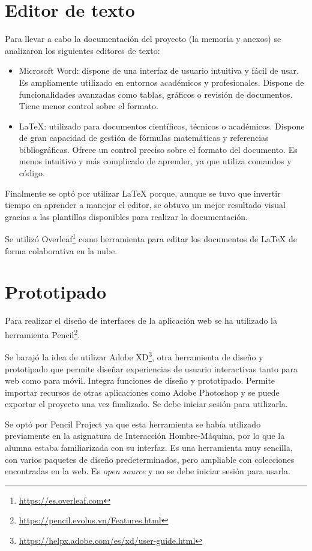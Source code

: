 \section{Editor de texto}
Para llevar a cabo la documentación del proyecto (la memoria y anexos) se analizaron los siguientes editores de texto:
\begin{itemize}
    \item Microsoft Word: dispone de una interfaz de usuario intuitiva y fácil de usar. Es ampliamente utilizado en entornos académicos y profesionales. Dispone de funcionalidades avanzadas como tablas, gráficos o revisión de documentos. Tiene menor control sobre el formato.
    \item \LaTeX{}: utilizado para documentos científicos, técnicos o académicos. Dispone de gran capacidad de gestión de fórmulas matemáticas y referencias bibliográficas. Ofrece un control preciso sobre el formato del documento. Es menos intuitivo y más complicado de aprender, ya que utiliza comandos y código.
\end{itemize}
Finalmente se optó por utilizar \LaTeX{} porque, aunque se tuvo que invertir tiempo en aprender a manejar el editor, se obtuvo un mejor resultado visual gracias a las plantillas disponibles para realizar la documentación.

Se utilizó Overleaf\footnote{\url{https://es.overleaf.com}} como herramienta para editar los documentos de \LaTeX{} de forma colaborativa en la nube.





\section{Prototipado}
Para realizar el diseño de interfaces de la aplicación web se ha utilizado la herramienta Pencil\footnote{\url{https://pencil.evolus.vn/Features.html}}.

Se barajó la idea de utilizar Adobe XD\footnote{\url{https://helpx.adobe.com/es/xd/user-guide.html}}, otra herramienta de diseño y prototipado que permite diseñar experiencias de usuario interactivas tanto para web como para móvil. Integra funciones de diseño y prototipado. Permite importar recursos de otras aplicaciones como Adobe Photoshop y se puede exportar el proyecto una vez finalizado. Se debe iniciar sesión para utilizarla.

Se optó por Pencil Project ya que esta herramienta se había utilizado previamente en la asignatura de Interacción Hombre-Máquina, por lo que la alumna estaba familiarizada con su interfaz. Es una herramienta muy sencilla, con varios paquetes de diseño predeterminados, pero ampliable con colecciones encontradas en la web. Es \textit{open source} y no se debe iniciar sesión para usarla.



